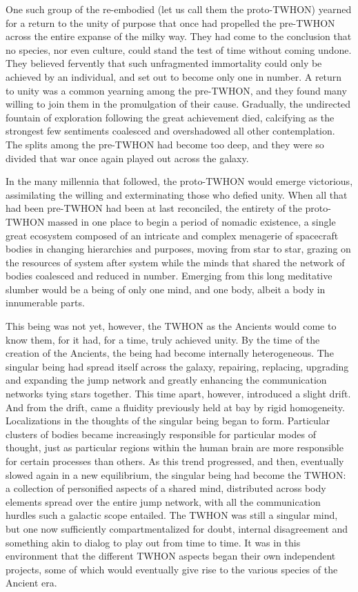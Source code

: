 One such group of the re-embodied (let us call them the proto-TWHON) 
yearned for a return to the unity of purpose that once had propelled 
the pre-TWHON across the entire expanse of the milky way. They had 
come to the conclusion that no species, nor even culture, could stand 
the test of time without coming undone. They believed fervently that 
such unfragmented immortality could only be achieved by an individual, 
and set out to become only one in number. A return to unity was a 
common yearning among the pre-TWHON, and they found many willing to 
join them in the promulgation of their cause. Gradually, the 
undirected fountain of exploration following the great achievement 
died, calcifying as the strongest few sentiments coalesced and 
overshadowed all other contemplation. The splits among the pre-TWHON 
had become too deep, and they were so divided that war once again 
played out across the galaxy. 

In the many millennia that followed, the proto-TWHON would emerge 
victorious, assimilating the willing and exterminating those who 
defied unity. When all that had been pre-TWHON had been at last 
reconciled, the entirety of the proto-TWHON massed in one place to 
begin a period of nomadic existence, a single great ecosystem composed 
of an intricate and complex menagerie of spacecraft bodies in changing 
hierarchies and purposes, moving from star to star, grazing on the 
resources of system after system while the minds that shared the 
network of bodies coalesced and reduced in number. Emerging from this 
long meditative slumber would be a being of only one mind, and one 
body, albeit a body in innumerable parts. 

This being was not yet, however, the TWHON as the Ancients would come
to know them, for it had, for a time, truly achieved unity. By the
time of the creation of the Ancients, the being had become internally
heterogeneous. The singular being had spread itself across the galaxy,
repairing, replacing, upgrading and expanding the jump network and
greatly enhancing the communication networks tying stars
together. This time apart, however, introduced a slight drift. And
from the drift, came a fluidity previously held at bay by rigid
homogeneity. Localizations in the thoughts of the singular being began
to form. Particular clusters of bodies became increasingly responsible
for particular modes of thought, just as particular regions within the
human brain are more responsible for certain processes than others. As
this trend progressed, and then, eventually slowed again in a new
equilibrium, the singular being had become the TWHON: a collection of
personified aspects of a shared mind, distributed across body elements
spread over the entire jump network, with all the communication
hurdles such a galactic scope entailed. The TWHON was still a singular
mind, but one now sufficiently compartmentalized for doubt, internal
disagreement and something akin to dialog to play out from time to
time. It was in this environment that the different TWHON aspects
began their own independent projects, some of which would eventually
give rise to the various species of the Ancient era.

